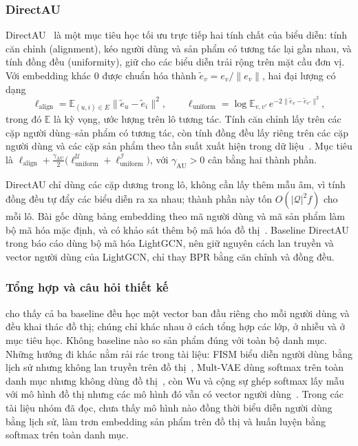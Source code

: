 \subsubsection{DirectAU}
\label{sec:directau}

DirectAU~\cite{wang2022directau} là một mục tiêu học tối ưu trực tiếp hai tính chất của biểu diễn: tính căn chỉnh (alignment), kéo người dùng và sản phẩm có tương tác lại gần nhau, và tính đồng đều (uniformity), giữ cho các biểu diễn trải rộng trên mặt cầu đơn vị. Với embedding khác 0 được chuẩn hóa thành $\tilde e_v=e_v/\|e_v\|$, hai đại lượng có dạng
\begin{equation}
\ell_{\mathrm{align}}=\mathbb{E}_{(u,i)\in E}\bigl\|\tilde e_u-\tilde e_i\bigr\|^2, \qquad
\ell_{\mathrm{uniform}}=\log\mathbb{E}_{v,v'}\,e^{-2\|\tilde e_v-\tilde e_{v'}\|^2} ,
\label{eq:align-uniform}
\end{equation}
trong đó $\mathbb{E}$ là kỳ vọng, ước lượng trên lô tương tác. Tính căn chỉnh lấy trên các cặp người dùng--sản phẩm có tương tác, còn tính đồng đều lấy riêng trên các cặp người dùng và các cặp sản phẩm theo tần suất xuất hiện trong dữ liệu~\cite{wang2022directau}. Mục tiêu là $\ell_{\mathrm{align}}+\tfrac{\gamma_{\mathrm{AU}}}{2}\bigl(\ell_{\mathrm{uniform}}^{\mathcal{U}}+\ell_{\mathrm{uniform}}^{\mathcal{I}}\bigr)$, với $\gamma_{\mathrm{AU}}>0$ cân bằng hai thành phần.

DirectAU chỉ dùng các cặp dương trong lô, không cần lấy thêm mẫu âm, vì tính đồng đều tự đẩy các biểu diễn ra xa nhau; thành phần này tốn $O(|\mathcal{Q}|^2f)$ cho mỗi lô. Bài gốc dùng bảng embedding theo mã người dùng và mã sản phẩm làm bộ mã hóa mặc định, và có khảo sát thêm bộ mã hóa đồ thị~\cite{wang2022directau}. Baseline DirectAU trong báo cáo dùng bộ mã hóa LightGCN, nên giữ nguyên cách lan truyền và vector người dùng của LightGCN, chỉ thay BPR bằng căn chỉnh và đồng đều.

\subsubsection{Tổng hợp và câu hỏi thiết kế}
\label{sec:trained-gap}

 cho thấy cả ba baseline đều học một vector ban đầu riêng cho mỗi người dùng và đều khai thác đồ thị; chúng chỉ khác nhau ở cách tổng hợp các lớp, ở nhiễu và ở mục tiêu học. Không baseline nào so sản phẩm đúng với toàn bộ danh mục. Những hướng đi khác nằm rải rác trong tài liệu: FISM biểu diễn người dùng bằng lịch sử nhưng không lan truyền trên đồ thị~\cite{kabbur2013fism}, Mult-VAE dùng softmax trên toàn danh mục nhưng không dùng đồ thị~\cite{liang2018multvae}, còn Wu và cộng sự ghép softmax lấy mẫu với mô hình đồ thị nhưng các mô hình đó vẫn có vector người dùng~\cite{wu2024sampledsoftmax}. Trong các tài liệu nhóm đã đọc, chưa thấy mô hình nào đồng thời biểu diễn người dùng bằng lịch sử, làm trơn embedding sản phẩm trên đồ thị và huấn luyện bằng softmax trên toàn danh mục.

